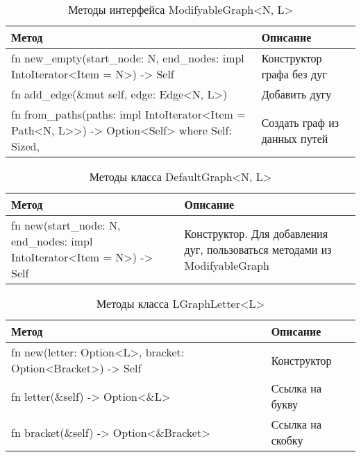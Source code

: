 \begin{table}
    \caption{Методы интерфейса ModifyableGraph<N, L>}
    \label{class_ModifyableGraphNL_api}
    \begin{tabular}{|m{20em}|m{20em}|}
        \hline
        \textbf{Метод} & \textbf{Описание}\\
        \hline
            fn new\_empty(start\_node: N, end\_nodes: impl IntoIterator<Item = N>) -> Self & Конструктор графа без дуг \\
        \hline
            fn add\_edge(\&mut self, edge: Edge<N, L>) & Добавить дугу \\
        \hline
            fn from\_paths(paths: impl IntoIterator<Item = Path<N, L>{}>) -> Option<Self> \newline where Self: Sized, & Создать граф из данных путей \\
        \hline
    \end{tabular}
\end{table}

\begin{table}
    \caption{Методы класса DefaultGraph<N, L>}
    \label{class_DefaultGraphNL_api}
    \begin{tabular}{|m{20em}|m{20em}|}
        \hline
        \textbf{Метод} & \textbf{Описание}\\
        \hline
            fn new(start\_node: N, end\_nodes: impl IntoIterator<Item = N>) -> Self & Конструктор. Для добавления дуг, пользоваться методами из ModifyableGraph \\
        \hline
    \end{tabular}
\end{table}

\begin{table}
    \caption{Методы класса LGraphLetter<L>}
    \label{class_LGraphLetterL_api}
    \begin{tabular}{|m{20em}|m{20em}|}
        \hline
        \textbf{Метод} & \textbf{Описание}\\
        \hline
            fn new(letter: Option<L>, bracket: Option<Bracket>) -> Self & Конструктор \\
        \hline
            fn letter(\&self) -> Option<\&L> & Ссылка на букву \\
        \hline
            fn bracket(\&self) -> Option<\&Bracket> & Ссылка на скобку \\
        \hline
    \end{tabular}
\end{table}


